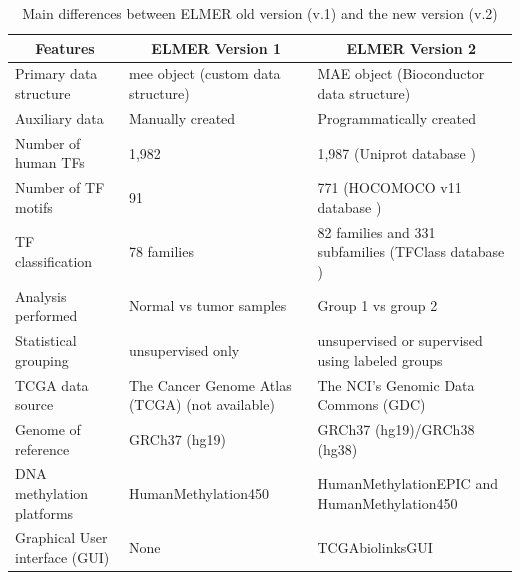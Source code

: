 \begin{table}[h!]
\centering
\caption{Main differences between ELMER old version (v.1) and the new version (v.2)}
\label{tab:summary}
\begin{tabular}{@{}p{3cm}p{5cm}p{6cm}@{}}
\toprule
\multicolumn{1}{c}{\textbf{Features}} & \multicolumn{1}{c}{\textbf{ELMER Version 1}} & \multicolumn{1}{c}{\textbf{ELMER Version 2}}   \\ \midrule
Primary data structure                   & mee object (custom data structure)                       & MAE object (Bioconductor data structure) \\
Auxiliary data                   & Manually created                       & Programmatically created \\
Number of human TFs                    & 1,982                                  & 1,987 (Uniprot database \cite{apweiler2004uniprot})                 \\
Number of TF motifs                   & 91                                     & 771  (HOCOMOCO v11 database \cite{kulakovskiy2016hocomoco})                 \\
TF classification                     & 78 families                            & 82 families and 331 subfamilies \newline(TFClass database \cite{wingender2013tfclass}) \\
Analysis performed            & Normal vs tumor samples & Group 1 vs group 2                       \\ 
Statistical grouping            & unsupervised only & unsupervised or supervised using labeled groups                       \\ 
TCGA data source                   & The Cancer Genome Atlas (TCGA) (not available)                   & The NCI's Genomic Data Commons (GDC)                                      \\
Genome of reference                   & GRCh37 (hg19)                          & GRCh37 (hg19)/GRCh38 (hg38)          \\
DNA methylation platforms             & HumanMethylation450                                   & HumanMethylationEPIC and HumanMethylation450                                \\
Graphical User interface (GUI)        & None                                   & TCGAbiolinksGUI                       \\
\bottomrule
\end{tabular}
\end{table}

